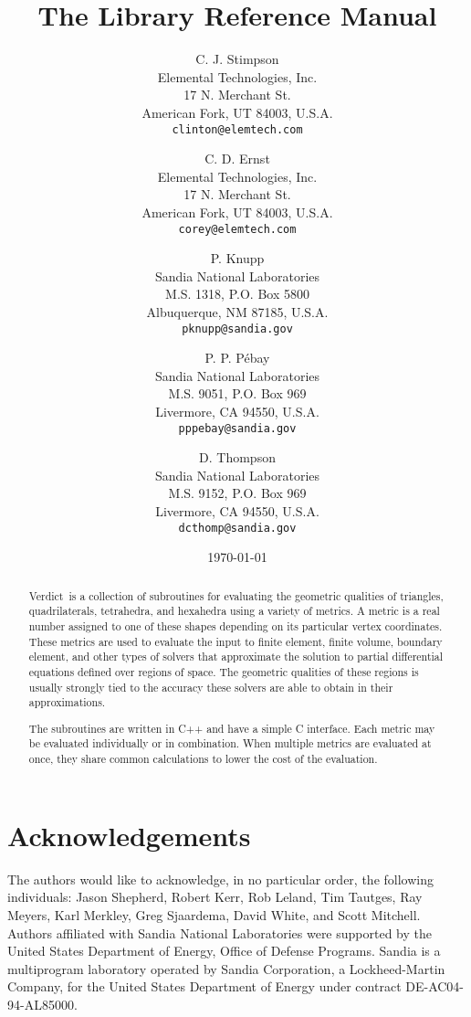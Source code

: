 \documentclass[11pt]{report}
\title{The \verd{} Library Reference Manual}
\author{C. J. Stimpson\\
        Elemental Technologies, Inc.\\
        17 N. Merchant St.\\
        American Fork, UT 84003, U.S.A.\\
        \texttt{clinton@elemtech.com}
        \and
        C. D. Ernst\\
        Elemental Technologies, Inc.\\
        17 N. Merchant St.\\
        American Fork, UT 84003, U.S.A.\\
        \texttt{corey@elemtech.com}
        \and
        P. Knupp\\
        Sandia National Laboratories\\
        M.S. 1318, P.O. Box 5800\\
        Albuquerque, NM 87185, U.S.A.\\
        \texttt{pknupp@sandia.gov}
        \and
        P. P. P\'ebay\\
        Sandia National Laboratories\\
        M.S. 9051, P.O. Box 969\\
        Livermore, CA 94550, U.S.A.\\
        \texttt{pppebay@sandia.gov}
        \and
        D. Thompson\\
        Sandia National Laboratories\\
        M.S. 9152, P.O. Box 969\\
        Livermore, CA 94550, U.S.A.\\
        \texttt{dcthomp@sandia.gov}
}
\date{\today}
\newcommand{\verd}{\textsf{Verdict}}
\begin{document}
\maketitle
\begin{abstract}
\verd\ is a collection of subroutines for evaluating the geometric qualities
of triangles, quadrilaterals, tetrahedra, and hexahedra using a variety of
metrics.
A metric is a real number assigned to one of these shapes depending on its
particular vertex coordinates.
These metrics are used to evaluate the input to finite element, finite volume,
boundary element, and other types of solvers that approximate the solution to
partial differential equations defined over regions of space.
The geometric qualities of these regions is usually strongly tied to the
accuracy these solvers are able to obtain in their approximations.

The subroutines are written in C++ and have a simple C interface.
Each metric may be evaluated individually or in combination.
When multiple metrics are evaluated at once, they share common
calculations to lower the cost of the evaluation.
\end{abstract}
\clearpage
\section*{Acknowledgements}
The authors would like to acknowledge, in no particular order, the
following individuals:
Jason Shepherd, Robert Kerr, Rob Leland, Tim Tautges, Ray Meyers, Karl
Merkley, Greg Sjaardema, David White, and Scott Mitchell.\\

Authors affiliated with Sandia National Laboratories were supported by
the United States Department of Energy, Office of Defense
Programs. Sandia is a multiprogram laboratory operated by Sandia
Corporation, a Lockheed-Martin Company, for the United States
Department of Energy under contract DE-AC04-94-AL85000.
\clearpage
\tableofcontents
\listoffigures
\cleardoublepage

\cleardoublepage

\cleardoublepage

\cleardoublepage

\cleardoublepage

\cleardoublepage

\cleardoublepage

\cleardoublepage

\cleardoublepage


\end{document}
